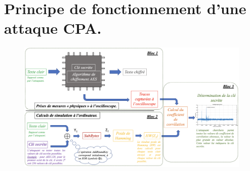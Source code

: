 \documentclass[oneside]{book}
\begin{document}
\section{Principe de fonctionnement d'une attaque CPA.}
\label{ann:CPAconcrete}
\begin{figure}[htbp]
    \centering
    \includegraphics[scale=0.52, angle=90]{image/CPAconcrete}
    \label{fig:CPAconcrete}
\end{figure}

\newpage

\end{document}
